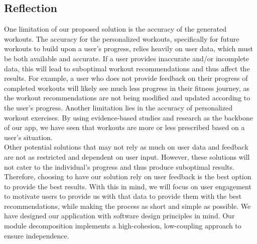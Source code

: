 \documentclass[12pt, titlepage]{article}
\begin{document}
\subsection{Reflection}
One limitation of our proposed solution is the accuracy of the generated workouts. The accuracy for the personalized workouts, specifically for future workouts to build upon a user’s progress, relies heavily on user data, which must be both available and accurate. If a user provides inaccurate and/or incomplete data, this will lead to suboptimal workout recommendations and thus affect the results. For example, a user who does not provide feedback on their progress of completed workouts will likely see much less progress in their fitness journey, as the workout recommendations are not being modified and updated according to the user’s progress. Another limitation lies in the accuracy of personalized workout exercises. By using evidence-based studies and research as the backbone of our app, we have seen that workouts are more or less prescribed based on a user’s situation. \\

Other potential solutions that may not rely as much on user data and feedback are not as restricted and dependent on user input. However, these solutions will not cater to the individual’s progress and thus produce suboptimal results. Therefore, choosing to have our solution rely on user feedback is the best option to provide the best results. With this in mind, we will focus on user engagement to motivate users to provide us with that data to provide them with the best recommendations, while making the process as short and simple as possible.  We have designed our application with software design principles in mind. Our module decomposition implements a high-cohesion, low-coupling approach to ensure independence. 
\end{document}
